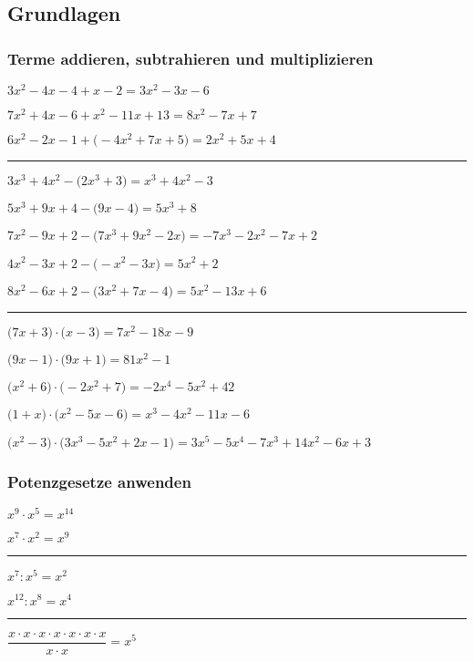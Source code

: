 \subsection{Grundlagen}\label{grundlagen}

\subsubsection{Terme addieren, subtrahieren und multiplizieren}

\begin{aufgaben}
\item $3 x^2-4 x-4 +  x-2 = 3 x^2-3 x-6$
\item $7 x^2+4 x-6 +  x^2-11 x+13 = 8 x^2-7 x+7$
\item $6 x^2-2 x-1 + \big(-4 x^2+7 x+5\big) = 2 x^2+5 x+4$ \\
\hrule
\item $3 x^3+4 x^2 - \big(2 x^3+3\big) =  x^3+4 x^2-3$
\item $5 x^3+9 x+4 - \big(9 x-4\big) = 5 x^3+8$
\item $7 x^2-9 x+2 - \big(7 x^3+9 x^2-2 x\big) = -7 x^3-2 x^2-7 x+2$
\item $4 x^2-3 x+2 - \big(- x^2-3 x\big) = 5 x^2+2$
\item $8 x^2-6 x+2 - \big(3 x^2+7 x-4\big) = 5 x^2-13 x+6$ \\
\hrule
\item $\big(7 x+3\big) \cdot \big( x-3\big) = 7 x^2-18 x-9$ \\
\item $\big(9 x-1\big) \cdot \big(9 x+1\big) = 81 x^2-1$ \\
\item $\big( x^2+6\big) \cdot \big(-2 x^2+7\big) = -2 x^4-5 x^2+42$ \\
\item $\big( 1+x\big) \cdot \big( x^2-5 x-6\big) =  x^3-4 x^2-11 x-6$ \\
\item $\big( x^2-3\big) \cdot \big(3 x^3-5 x^2+2 x-1\big) = 3 x^5-5 x^4-7 x^3+14 x^2-6 x+3$
\end{aufgaben}

\subsubsection{Potenzgesetze anwenden}

\begin{aufgaben}
\item $x^9\cdot x^5=x^{14}$
\item $x^7\cdot x^2=x^9$
\hrule
\item $x^7:x^5 = x^2$
\item $x^{12}:x^{8}=x^4$
\hrule
\item $\dfrac{x\cdot x\cdot x\cdot x\cdot x\cdot x\cdot x}{x\cdot x}=x^5$
\end{aufgaben}